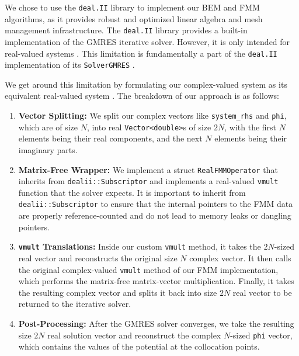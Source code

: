 We chose to use the \texttt{deal.II} library \cite{arndtdealiilibraryversion} to implement our \ac{BEM} and \ac{FMM} algorithms, as it provides robust and optimized linear algebra and mesh management infrastructure. The \texttt{deal.II} library provides a built-in implementation of the \ac{GMRES} iterative solver. However, it is only intended for real-valued systems \cite{dealiilibrarystep58}. This limitation is fundamentally a part of the \texttt{deal.II} implementation of its \texttt{SolverGMRES} \cite{dealiilibrarysolvergmres}.

We get around this limitation by formulating our complex-valued system as its equivalent real-valued system \cite{daysolvingcomplexvaluedlinear2001}. The breakdown of our approach is as follows:

\begin{enumerate}
    \item \textbf{Vector Splitting:} We split our complex vectors like \texttt{system\_rhs} and \texttt{phi}, which are of size $N$, into real \texttt{Vector<double>}s of size $2N$, with the first $N$ elements being their real components, and the next $N$ elements being their imaginary parts.
    \item \textbf{Matrix-Free Wrapper:} We implement a struct \texttt{RealFMMOperator} that inherits from \texttt{dealii::Subscriptor} and implements a real-valued \texttt{vmult} function that the solver expects. It is important to inherit from \texttt{dealii::Subscriptor} to ensure that the internal pointers to the \ac{FMM} data are properly reference-counted and do not lead to memory leaks or dangling pointers.
    \item \textbf{\texttt{vmult} Translations:} Inside our custom \texttt{vmult} method, it takes the $2N$-sized real vector and reconstructs the original size $N$ complex vector. It then calls the original complex-valued \texttt{vmult} method of our \ac{FMM} implementation, which performs the matrix-free matrix-vector multiplication. Finally, it takes the resulting complex vector and splits it back into size $2N$ real vector to be returned to the iterative solver.
    \item \textbf{Post-Processing:} After the \ac{GMRES} solver converges, we take the resulting size $2N$ real solution vector and reconstruct the complex $N$-sized \texttt{phi} vector, which contains the values of the potential at the collocation points.
    
\end{enumerate}

